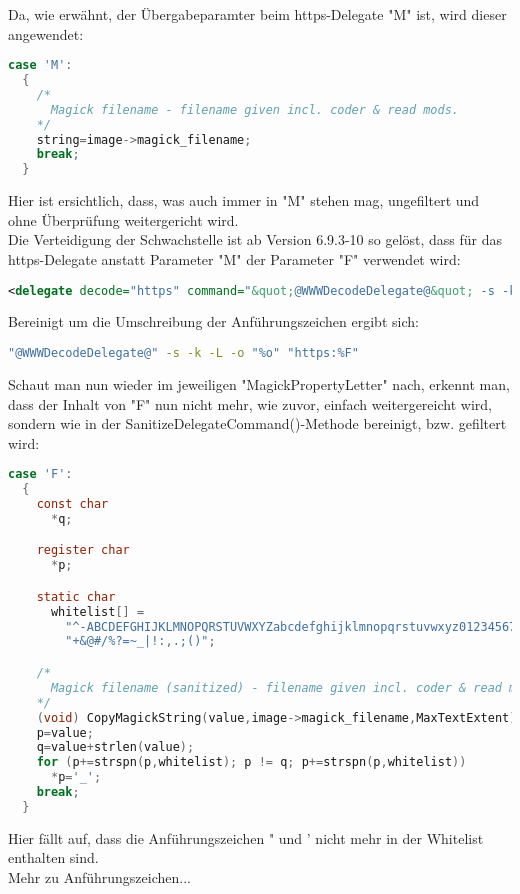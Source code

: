 Da, wie erwähnt, der Übergabeparamter beim https-Delegate "M" ist, wird dieser angewendet:\\

\begin{lstlisting}[firstnumber=2627, language=C, caption=magick/property.c Ungefilterte Weitergabe M-Parameter,label={lst:lstlisting}]
  case 'M':
  {
    /*
      Magick filename - filename given incl. coder & read mods.
    */
    string=image->magick_filename;
    break;
  }
\end{lstlisting}
\vspace{5mm}

Hier ist ersichtlich, dass, was auch immer in "M" stehen mag, ungefiltert und ohne Überprüfung weitergericht wird.\\

Die Verteidigung der Schwachstelle ist ab Version 6.9.3-10 so gelöst, dass für das https-Delegate anstatt Parameter "M" der Parameter "F" verwendet wird:\\

\begin{lstlisting}[firstnumber=91, language=XML, caption=config/delegates.xml.in https-Delegate 6.9.3-10,label={lst:lstlisting}]
  <delegate decode="https" command="&quot;@WWWDecodeDelegate@&quot; -s -k -L -o &quot;%o&quot; &quot;https:%F&quot;"/>
\end{lstlisting}
\vspace{5mm}

Bereinigt um die Umschreibung der Anführungszeichen ergibt sich:\\

\begin{lstlisting}[firstnumber=1, language=Bash, caption=Aufgelöster https-Delegate-Befehl 6.9.3-10,label={lst:lstlisting}]
"@WWWDecodeDelegate@" -s -k -L -o "%o" "https:%F"
\end{lstlisting}
\vspace{5mm}

Schaut man nun wieder im jeweiligen "MagickPropertyLetter" nach, erkennt man, dass der Inhalt von "F" nun nicht mehr, wie zuvor, einfach weitergereicht wird, sondern wie in der SanitizeDelegateCommand()-Methode bereinigt, bzw. gefiltert wird:\\

\begin{lstlisting}[firstnumber=2610, language=C, caption=magick/property.c Gefilterte Wietergabe F-Parameter,label={lst:lstlisting}]
  case 'F':
  {
    const char
      *q;

    register char
      *p;

    static char
      whitelist[] =
        "^-ABCDEFGHIJKLMNOPQRSTUVWXYZabcdefghijklmnopqrstuvwxyz0123456789"
        "+&@#/%?=~_|!:,.;()";

    /*
      Magick filename (sanitized) - filename given incl. coder & read mods.
    */
    (void) CopyMagickString(value,image->magick_filename,MaxTextExtent);
    p=value;
    q=value+strlen(value);
    for (p+=strspn(p,whitelist); p != q; p+=strspn(p,whitelist))
      *p='_';
    break;
  }
\end{lstlisting}
\vspace{5mm}

Hier fällt auf, dass die Anführungszeichen " und ' nicht mehr in der Whitelist enthalten sind.\\

Mehr zu Anführungszeichen...